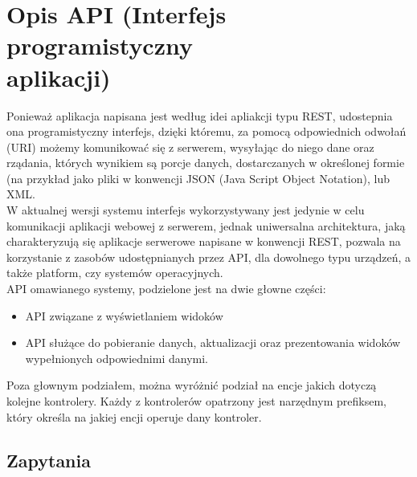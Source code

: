 \documentclass[a4paper, titlepage]{article}
\begin{document}
\section{Opis API (Interfejs programistyczny\\ aplikacji)}				
	Ponieważ aplikacja napisana jest według idei apliakcji typu REST, udostepnia ona programistyczny interfejs, dzięki któremu, za pomocą odpowiednich odwołań (URI) możemy komunikować się z serwerem, wysyłając do niego dane oraz rządania, których wynikiem są porcje danych, dostarczanych w określonej formie (na przykład jako pliki w konwencji JSON (Java Script Object  Notation), lub XML.
    \\W aktualnej wersji systemu interfejs wykorzystywany jest jedynie w celu komunikacji aplikacji webowej z serwerem, jednak uniwersalna architektura, jaką charakteryzują się aplikacje serwerowe napisane w konwencji REST, pozwala na korzystanie z zasobów udostępnianych przez API, dla dowolnego typu urządzeń, a także platform, czy systemów operacyjnych. 
    \\API omawianego systemy, podzielone jest na dwie głowne części:
    \begin{itemize}
    \item API związane z wyświetlaniem widoków
    \item API służące do pobieranie danych, aktualizacji oraz prezentowania widoków wypełnionych odpowiednimi danymi.
    \end{itemize}
    
    Poza głownym podziałem, można wyróżnić podział na encje jakich dotyczą kolejne kontrolery. Każdy z kontrolerów opatrzony jest narzędnym prefiksem, który określa na jakiej encji operuje dany kontroler. 
    			\subsection{Zapytania}
\end{document}
